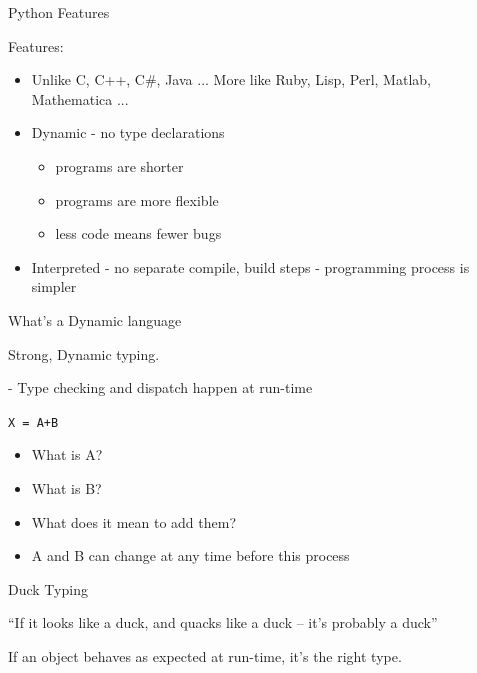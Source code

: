 \documentclass{beamer}
\begin{document}
\begin{frame}{Python Features}

{\Large Features:}

\begin{itemize}
  \item  Unlike C, C++, C\#, Java ... More like Ruby, Lisp, Perl, Matlab, Mathematica ...
  \item  Dynamic - no type declarations
    \begin{itemize}
      \item programs are shorter
      \item programs are more flexible
      \item less code means fewer bugs
    \end{itemize}
  \item  Interpreted - no separate compile, build steps - programming process is simpler
\end{itemize}

\end{frame}

\begin{frame}[fragile]{What's a Dynamic language}

{Strong, Dynamic typing.}

 - Type checking and dispatch happen at run-time

\vspace{0.25in}
{\Large \verb!X = A+B!}
\vspace{0.1in}
\begin{itemize}
\pause
  \item What is A?
  \item What is B?
  \item What does it mean to add them?
\vspace{0.2in}
\pause
  \item A and B can change at any time before this process
\end{itemize}

\end{frame} 


\begin{frame}{Duck Typing}

\vspace{0.25in}
{\center \Large ``If it looks like a duck, and quacks like a duck -- it's probably a duck''}

\pause
\vspace{0.5in}
{\center \Large If an object behaves as expected at run-time, it's the right type.}

\end{frame}
\end{document}
